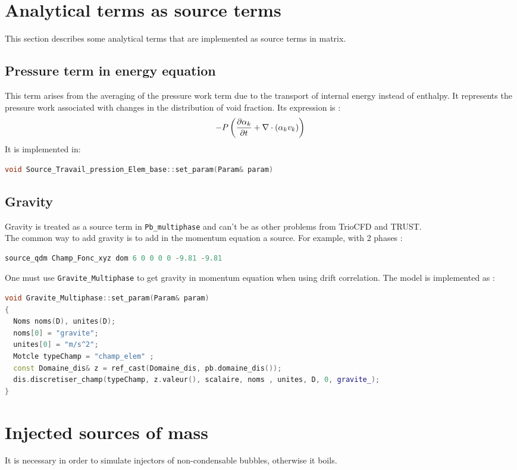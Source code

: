\section{Analytical terms as source terms}\label{sec:analytical}
This section describes some analytical terms that are implemented as source terms in matrix.
\subsection{Pressure term in energy equation}
This term arises from the averaging of the pressure work term due to the transport of internal energy instead of enthalpy. It represents the pressure work associated with changes in the distribution of void fraction. Its expression is :
\begin{equation}
    -P\left( \frac{\partial \alpha_k}{\partial t}+\nabla \cdot (\alpha_k v_k) \right)
\end{equation}
It is implemented in:
\begin{lstlisting}[language=c++]
void Source_Travail_pression_Elem_base::set_param(Param& param)
\end{lstlisting}
\subsection{Gravity}
Gravity is treated as a source term in \texttt{Pb_multiphase} and can't be as other problems from TrioCFD and TRUST. \\
The common way to add gravity is to add in the momentum equation a source. For example, with 2 phases :
\begin{lstlisting}[language=c++]
source_qdm Champ_Fonc_xyz dom 6 0 0 0 0 -9.81 -9.81
\end{lstlisting}
One must use \texttt{Gravite_Multiphase} to get gravity in momentum equation when using drift correlation.
The model is implemented as :
\begin{lstlisting}[language=c++]
void Gravite_Multiphase::set_param(Param& param)
{
  Noms noms(D), unites(D);
  noms[0] = "gravite";
  unites[0] = "m/s^2";
  Motcle typeChamp = "champ_elem" ;
  const Domaine_dis& z = ref_cast(Domaine_dis, pb.domaine_dis());
  dis.discretiser_champ(typeChamp, z.valeur(), scalaire, noms , unites, D, 0, gravite_);
}
\end{lstlisting}

\section{Injected sources of mass}\label{sec:injection}
It is necessary in order to simulate injectors of non-condensable bubbles, otherwise it boils.
